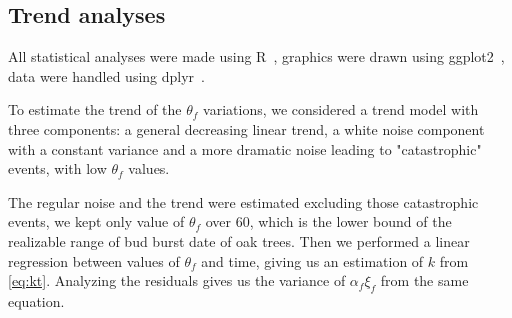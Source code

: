 \subsection*{Trend analyses}

All statistical analyses were made using R~\citep{R_2014}, graphics were drawn using ggplot2~\citep{ggplot2_2009}, data were handled using dplyr~\citep{dplyr_2014}.

To estimate the trend of the $\theta_f$ variations, we considered a trend model with three components: a general decreasing linear trend, a white noise component with a constant variance and a more dramatic noise leading to "catastrophic" events, with low $\theta_f$ values.

The regular noise and the trend were estimated excluding those catastrophic events, we kept only value of $\theta_f$ over 60, which is the lower bound of the realizable range of bud burst date of oak trees. Then we performed a linear regression between values of $\theta_f$ and time, giving us an estimation of $k$ from \autoref{eq:kt}. Analyzing the residuals gives us the variance of $\alpha_f \xi_f$ from the same equation.

